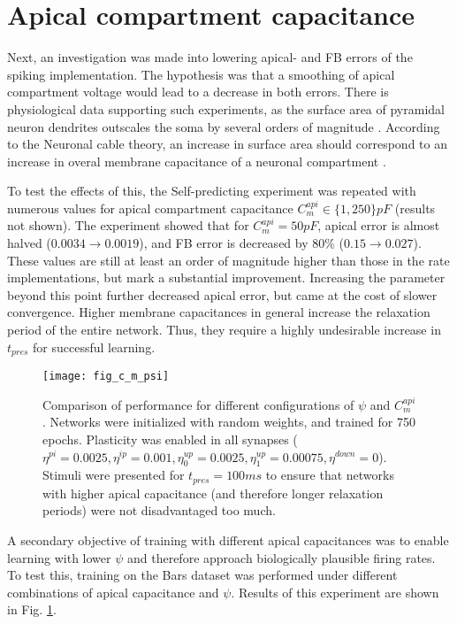 \section{Apical compartment capacitance}\label{sec-c-m-api}

Next, an investigation was made into lowering apical- and FB errors of the spiking implementation. The hypothesis was
that a smoothing of apical compartment voltage would lead to a decrease in both errors. There is physiological data
supporting such experiments, as the surface area of pyramidal neuron dendrites outscales the soma by several orders of
magnitude \citep{Ishizuka1995}. According to the Neuronal cable theory, an increase in surface area should correspond to
an increase in overal membrane capacitance of a neuronal compartment \citep{Niebur2008}.


To test the effects of this, the Self-predicting experiment was repeated with numerous values for apical compartment
capacitance $C_m^{api} \in \{ 1, 250 \} pF$ (results not shown). The experiment showed that for $C_m^{api} = 50pF$,
apical error is almost halved ($0.0034 \rightarrow 0.0019$), and FB error is decreased by $80\%$ ($0.15 \rightarrow
    0.027$). These values are still at least an order of magnitude higher than those in the rate implementations, but mark a
substantial improvement. Increasing the parameter beyond this point further decreased apical error, but came at the cost
of slower convergence. Higher membrane capacitances in general increase the relaxation period of the entire network.
Thus, they require a highly undesirable increase in $t_{pres}$ for successful learning.

\begin{figure}[h]
    \centering
    \texttt{[image: fig\_c\_m\_psi]}
    \caption[Comparison of performance for different configurations of $\psi$ and $C_m^{api}$.]{Comparison of
    performance for different  configurations of $\psi$ and $C_m^{api}$. Networks were initialized with random weights,
    and trained for 750 epochs. Plasticity was enabled in all synapses ($\eta^{pi}=0.0025, \eta^{ip}=0.001,
        \eta^{up}_0=0.0025, \eta^{up}_1=0.00075, \eta^{down}=0$). Stimuli were presented for $t_{pres}=100ms$ to ensure that
    networks with higher apical capacitance (and therefore longer relaxation periods) were not disadvantaged too much. }
    \label{fig-c-m-psi}
\end{figure}

A secondary objective of training with different apical capacitances was to enable learning with lower $\psi$ and
therefore approach biologically plausible firing rates. To test this, training on the Bars dataset was performed under
different combinations of apical capacitance and $\psi$. Results of this experiment are shown in Fig. \ref{fig-c-m-psi}.

